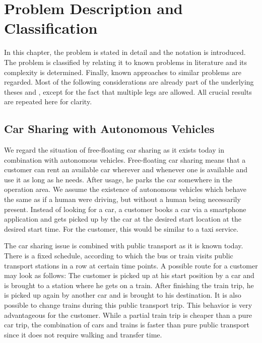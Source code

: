 \chapter{Problem Description and Classification}
\label{ch:problem_description}

In this chapter, the problem is stated in detail and the notation is introduced. The problem is classified by relating it to known problems in literature and its complexity is determined. Finally, known approaches to similar problems are regarded. Most of the following considerations are already part of the underlying theses \cite{Kaiser} and \cite{Knoll}, except for the fact that multiple legs are allowed. All crucial results are repeated here for clarity.

\section{Car Sharing with Autonomous Vehicles}

We regard the situation of free-floating car sharing as it exists today in combination with autonomous vehicles. Free-floating car sharing means that a customer can rent an available car wherever and whenever one is available and use it as long as he needs. After usage, he parks the car somewhere in the operation area. We assume the existence of autonomous vehicles which behave the same as if a human were driving, but without a human being necessarily present. Instead of looking for a car, a customer books a car via a smartphone application and gets picked up by the car at the desired start location at the desired start time. For the customer, this would be similar to a taxi service. 

The car sharing issue is combined with public transport as it is known today. There is a fixed schedule, according to which the bus or train visits public transport stations in a row at certain time points. A possible route for a customer may look as follows: The customer is picked up at his start position by a car and is brought to a station where he gets on a train. After finishing the train trip, he is picked up again by another car and is brought to his destination. It is also possible to change trains during this public transport trip. This behavior is very advantageous for the customer. While a partial train trip is cheaper than a pure car trip, the combination of cars and trains is faster than pure public transport since it does not require walking and transfer time.

\newpage

